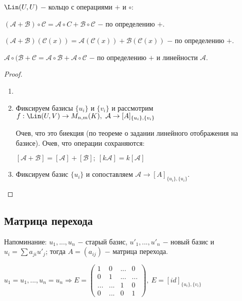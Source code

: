 \begin{remark}
    $\Lin (U, U)$ $-$ кольцо с операциями $+$ и $\circ$:

     $(\mathcal{A}+\mathcal{B})\circ \mathcal{C}=\mathcal{A}\circ 
C+\mathcal{B}\circ \mathcal{C}$ $-$ по определению $+$.

     $(\mathcal{A}+\mathcal{B})(\mathcal{C}(x))=\mathcal{A} 
(\mathcal{C}(x))+\mathcal{B}(\mathcal{C}(x))$ $-$ по определению $+$.

     $\mathcal{A}\circ(\mathcal{B}+ \mathcal{C}=\mathcal{A}\circ 
\mathcal{B}+\mathcal{A}\circ \mathcal{C}$ $-$ по определению $+$ и 
линейности $\mathcal{A}$.
\end{remark}

\begin{proof}
    \begin{enumerate}
        \item[]
        \item Фиксируем базисы $\{u_i\}$ и $\{v_i\}$ и рассмотрим $f:\Lin 
(U, V)\rightarrow M_{n,m}(K),\ \mathcal{A}\rightarrow 
[A]_{\{u_i\},\{v_i\}}$

        Очев, что это биекция (по теореме о задании линейного отображения 
на базисе). Очев, что операции сохраняются:

        $[\mathcal{A}+\mathcal{B}]=[\mathcal{A}]+[\mathcal{B}];\ 
[k\mathcal{A}]=k[\mathcal{A}]$
        \item Фиксируем базис $\{u_i\}$ и сопоставляем 
$\mathcal{A}\rightarrow [A]_{\{u_i\},\{u_i\}}$.
    \end{enumerate}
\end{proof}

\subsection{Матрица перехода}

Напоминание: $u_1,...,u_n$ $-$ старый базис, $u'_1,...,u'_n$ $-$ новый 
базис и $u_i=\sum a_{ji}u'_j$; тогда $A=(a_{ij})$ $-$ матрица перехода.

\begin{remark}
    $u_1=u_1,...,u_n=u_n\Rightarrow E=\begin{pmatrix}
        1 & 0 & ... & 0 \\
        0 & 1 & ... & ... \\
        ... & ... & 1 & 0 \\
        0 & ... & 0 & 1
    \end{pmatrix},\ E=[id]_{\{u_i\},\{v_i\}}$
\end{remark}

